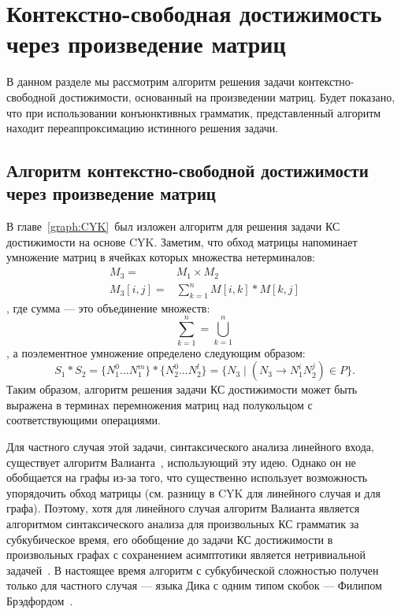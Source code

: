 \chapter[Контекстно-свободная достижимость через произведение матриц]{Контекстно-свободная достижимость через произведение матриц}\label{chpt:MatrixBasedAlgos}

В данном разделе мы рассмотрим алгоритм решения задачи контекстно-свободной достижимости, основанный на произведении матриц.
Будет показано, что при использовании конъюнктивных грамматик, представленный алгоритм находит переаппроксимацию истинного решения задачи.

\section[Алгоритм контекстно-свободной достижимости через произведение матриц]{Алгоритм контекстно-свободной достижимости через произведение матриц}
\label{Matrix-CFPQ}

В главе~\ref{graph:CYK}~был изложен алгоритм для решения задачи КС достижимости на основе CYK.
Заметим, что обход матрицы напоминает умножение матриц в ячейках которых множества нетерминалов:
\begin{align*}
M_3 = &M_1 \times M_2 \\
M_3[i,j] = &\sum_{k=1}^{n} M[i,k] * M[k,j]
\end{align*}
, где сумма --- это объединение множеств:
\[
\sum_{k=1}^{n} = \bigcup_{k=1}^{n}
\]
, а поэлементное умножение определено следующим образом:
\[
S_1 * S_2 = \{N_1^0 ... N_1^m\} * \{N_2^0 ... N_2^l\} = \{N_3 \mid (N_3 \rightarrow N_1^i N_2^j) \in P\}.
\]
Таким образом, алгоритм решения задачи КС достижимости может быть выражена в терминах перемножения матриц над полукольцом с соответствующими операциями.

Для частного случая этой задачи, синтаксического анализа линейного входа, существует алгоритм Валианта~\cite{Valiant:1975:GCR:1739932.1740048}, использующий эту идею.
Однако он не обобщается на графы из-за того, что существенно использует возможность упорядочить обход матрицы (см. разницу в CYK для линейного случая и для графа).
Поэтому, хотя для линейного случая алгоритм Валианта является алгоритмом синтаксического анализа для произвольных КС грамматик за субкубическое время, его обобщение до задачи КС достижимости в произвольных графах с сохранением асимптотики является нетривиальной задачей~\cite{Yannakakis}.
В настоящее время алгоритм с субкубической сложностью получен только для частного случая --- языка Дика с одним типом скобок --- Филипом Брэдфордом~\cite{8249039}.


